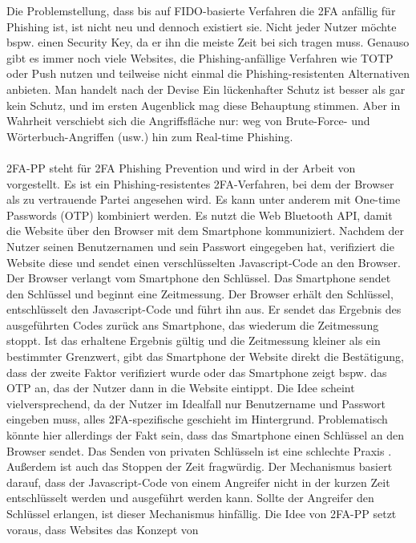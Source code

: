 Die Problemstellung, dass bis auf FIDO-basierte Verfahren die 2FA anfällig für Phishing ist, ist 
nicht neu und dennoch existiert sie. Nicht jeder Nutzer möchte bspw. einen Security Key, da er 
ihn die meiste Zeit bei sich tragen muss. Genauso gibt es immer noch viele Websites, die 
Phishing-anfällige Verfahren wie TOTP oder Push nutzen und teilweise nicht einmal die 
Phishing-resistenten Alternativen anbieten. Man handelt nach der Devise \glqq Ein lückenhafter 
Schutz ist besser als gar kein Schutz\grqq{}, und im ersten Augenblick mag diese Behauptung 
stimmen. Aber in Wahrheit verschiebt sich die Angriffsfläche nur: weg von Brute-Force- und 
Wörterbuch-Angriffen (usw.) hin zum Real-time Phishing.
\\\\
2FA-PP steht für 2FA Phishing Prevention und wird in der Arbeit von \textcite{2FAPP} vorgestellt. Es ist ein 
Phishing-resistentes 2FA-Verfahren, bei dem der Browser als zu vertrauende Partei angesehen wird. 
Es kann unter anderem mit One-time Passwords (OTP) kombiniert werden. Es nutzt die Web Bluetooth 
API, damit die Website über den Browser mit dem Smartphone kommuniziert. Nachdem der Nutzer 
seinen Benutzernamen und sein Passwort eingegeben hat, verifiziert die Website diese und sendet 
einen verschlüsselten Javascript-Code an den Browser. Der Browser verlangt vom Smartphone den 
Schlüssel. Das Smartphone sendet den Schlüssel und beginnt eine Zeitmessung. Der Browser erhält 
den Schlüssel, entschlüsselt den Javascript-Code und führt ihn aus. Er sendet das Ergebnis des 
ausgeführten Codes zurück ans Smartphone, das wiederum die Zeitmessung stoppt. Ist das erhaltene 
Ergebnis gültig und die Zeitmessung kleiner als ein bestimmter Grenzwert, gibt das Smartphone der 
Website direkt die Bestätigung, dass der zweite Faktor verifiziert wurde oder das Smartphone 
zeigt bspw. das OTP an, das der Nutzer dann in die Website eintippt. Die Idee scheint 
vielversprechend, da der Nutzer im Idealfall nur Benutzername und Passwort eingeben muss, alles 
2FA-spezifische geschieht im Hintergrund. Problematisch könnte hier allerdings der Fakt sein, 
dass das Smartphone einen Schlüssel an den Browser sendet. Das Senden von privaten Schlüsseln ist eine 
schlechte Praxis \autocite{DIGI}. Außerdem ist auch das Stoppen der Zeit fragwürdig. Der 
Mechanismus basiert darauf, dass der Javascript-Code von einem Angreifer nicht in der kurzen Zeit 
entschlüsselt werden und ausgeführt werden kann. Sollte der Angreifer den Schlüssel erlangen, ist 
dieser Mechanismus hinfällig. Die Idee von 2FA-PP setzt voraus, dass Websites das Konzept von 
